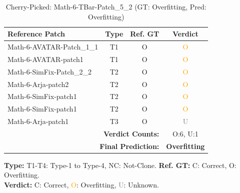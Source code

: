 \begin{table}[t]
\centering
\caption{Cherry-Picked: Math-6-TBar-Patch\_5\_2 (GT: Overfitting, Pred: Overfitting)}
\label{tab:cherry-Math6TBarPatch52}
\footnotesize
\renewcommand{\arraystretch}{1.1}
\setlength{\tabcolsep}{4pt}
\begin{tabular}{l|c|c|c}
\hline
\textbf{Reference Patch} & \textbf{Type} & \textbf{Ref. GT} & \textbf{Verdict} \\
\hline
Math-6-AVATAR-Patch\_1\_1 & T1 & O & \textcolor{orange}{O} \\
Math-6-AVATAR-patch1 & T1 & O & \textcolor{orange}{O} \\
Math-6-SimFix-Patch\_2\_2 & T2 & O & \textcolor{orange}{O} \\
Math-6-Arja-patch2 & T2 & O & \textcolor{orange}{O} \\
Math-6-SimFix-patch1 & T2 & O & \textcolor{orange}{O} \\
Math-6-SimFix-patch1 & T2 & O & \textcolor{orange}{O} \\
Math-6-Arja-patch1 & T3 & O & \textcolor{gray}{U} \\
\hline
\multicolumn{3}{r|}{\textbf{Verdict Counts:}} & O:6, U:1 \\
\multicolumn{3}{r|}{\textbf{Final Prediction:}} & \textbf{Overfitting} \\
\hline
\end{tabular}
\vspace{1mm}
\parbox{\linewidth}{\centering\footnotesize 
\vspace{1mm}
\textbf{Type:} T1-T4: Type-1 to Type-4, NC: Not-Clone. \;
\textbf{Ref. GT:} C: Correct, O: Overfitting. \\
\textbf{Verdict:} \textcolor{green!60!black}{C}: Correct, \textcolor{orange}{O}: Overfitting, \textcolor{gray}{U}: Unknown.}
\end{table}


